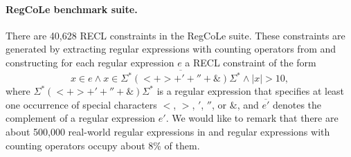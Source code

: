 \paragraph*{RegCoLe benchmark suite.} There are 40,628 RECL constraints in the RegCoLe suite.  These constraints are generated by extracting regular expressions with counting operators from \cite{regex_lingua_franca,redos_lenka} and constructing for each regular expression $e$ a RECL constraint of the form 
$$x \in e \wedge x \in \overline{\Sigma^*(<+ >+'+''+\&)\Sigma^*} \wedge |x| > 10,$$   
where $\Sigma^*(<+ >+'+''+\&)\Sigma^*$ is a regular expression that specifies at least one occurrence of special characters $<$, $>$, $'$, $''$, or $\&$, and $\overline{e'}$ denotes the complement of a regular expression $e'$. We would like to remark that there are about 500,000 real-world regular expressions in \cite{regex_lingua_franca,redos_lenka} and regular expressions with counting operators occupy about 8\% of them. 

